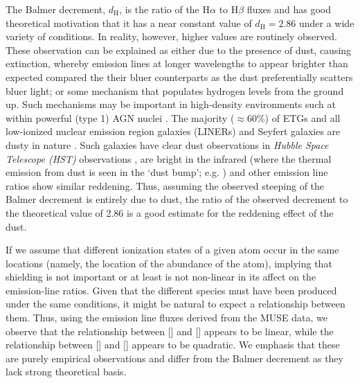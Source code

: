 		The Balmer decrement, $d_\mathrm{H}$, is the ratio of the H$\alpha$ to H$\beta$ fluxes and has good theoretical motivation that it has a near constant value of $d_\mathrm{H} = 2.86$ under a wide variety of conditions. In reality, however, higher values are routinely observed. These observation can be explained as either due to the presence of dust, causing extinction, whereby emission lines at longer wavelengths to appear brighter than expected compared the their bluer counterparts as the dust preferentially scatters bluer light; or some mechanism that populates hydrogen levels from the ground up. Such mechanisms may be important in high-density environments such at within powerful (type 1) AGN nuclei \citep[e.g.][]{Shields1974, Netzer1975}. The majority ($\approx 60$\%) of ETGs and all low-ionized nuclear emission region galaxies (LINERs) and Seyfert galaxies are dusty in nature \citep[e.g.][]{Martini2013}. Such galaxies have clear dust observations in \textit{Hubble Space Telescope (HST)} observations \citep[e.g.][]{Martini2013}, are bright in the infrared (where the thermal emission from dust is seen in the `dust bump'; e.g. \citealt{Jura1987, Knapp1992}) and other emission line ratios \citep[e.g.  in ][]{Wampler1968} show similar reddening. Thus, assuming the observed steeping of the Balmer decrement is entirely due to dust, the ratio of the observed decrement to the theoretical value of 2.86 is a good estimate for the reddening effect of the dust.

		If we assume that different ionization states of a given atom occur in the same locations (namely, the location of the abundance of the atom), implying that shielding is not important or at least is not non-linear in its affect on the emission-line ratios. Given that the different species must have been produced under the same conditions, it might be natural to expect a relationship between them. Thus, using the emission line fluxes derived from the MUSE data, we observe that the relationship between [] and [] appears to be linear, while the relationship between [] and [] appears to be quadratic. We emphasis that these are purely empirical observations and differ from the Balmer decrement as they lack strong theoretical basis. 


